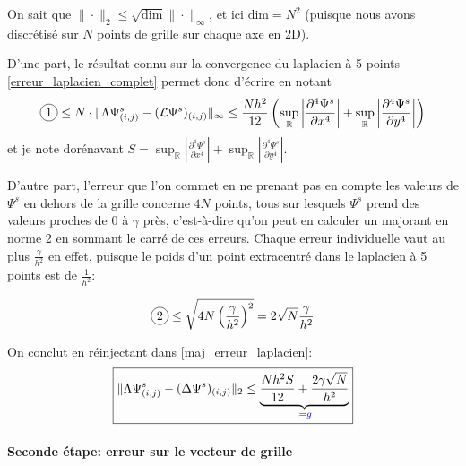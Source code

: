 \documentclass[svgnames,dvipsnames,a4paper,10pt,french]{report}
\newcommand*\circled[1]{\tikz[baseline=(char.base)]{\node[shape=circle,draw,inner sep=2pt] (char) {#1};}}
\begin{document}
\begin{appendices}
On sait que  $\|\cdot \|_2 \le \sqrt{\text{dim}} \| \cdot \|_\infty$, et ici $\text{dim} = N^2$ (puisque nous avons discrétisé sur $N$ points de grille sur chaque axe en 2D).


D'une part, le résultat connu sur la convergence du laplacien à 5 points \ref{erreur_laplacien_complet} permet donc d'écrire en notant
\begin{equation}
    \circled{1} \le N  \cdot \|\Lambda \Psi^s_{(i,j)} - (\mathcal{L}\Psi^s)_{(i,j)} \|_\infty \le   \frac{Nh^2}{12} \left( \sup_{\mathbb{R}} \left|\frac{\partial^4 \Psi^s}{\partial x^4}\right| +\sup_{\mathbb{R}} \left|\frac{\partial^4 \Psi^s}{\partial y^4} \right| \right)
\end{equation}
et je note dorénavant $S =  \sup_{\mathbb{R}} \left|\frac{\partial^4 \Psi^s}{\partial x^4}\right| +\sup_{\mathbb{R}} \left|\frac{\partial^4 \Psi^s}{\partial y^4} \right| $.

D'autre part,  l'erreur que l'on commet en ne prenant pas en compte les valeurs de $\Psi^s$ en dehors de la grille concerne $4N$ points, tous sur lesquels $\Psi^s$ prend des valeurs proches de $0$ à $\gamma$ près, c'est-à-dire qu'on peut en calculer un majorant en norme 2 en sommant le carré de ces erreurs. Chaque erreur individuelle vaut au plus $\frac{\gamma}{h^2}$ en effet, puisque le poids d'un point extracentré dans le laplacien à 5 points est de $\frac{1}{h^2}$:

\begin{equation}
    \circled{2}  \le \sqrt{4N\left(\frac{\gamma}{h^2}\right)^2} = 2\sqrt{N}\frac{\gamma}{h^2}
\end{equation}

On conclut en réinjectant dans \ref{maj_erreur_laplacien}:
\begin{equation}
\label{majorant_erreur_laplacien_solution_exacte}
    \boxed{\|\Lambda \Psi^s_{(i,j)} - (\Delta\Psi^s)_{(i,j)} \|_2 \le \underbrace{ \frac{Nh^2S}{12} + \frac{2\gamma\sqrt{N} }{h^2} }_{\textcolor{blue}{\coloneqq g}}}
\end{equation}

\paragraph{Seconde étape: erreur sur le vecteur de grille}


\end{appendices}
\end{document}
